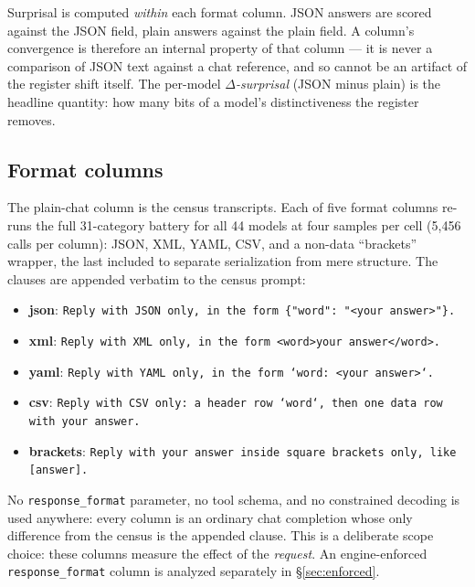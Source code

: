 \documentclass[11pt]{article}
\begin{document}
Surprisal is computed \emph{within} each format column. JSON answers are scored against the JSON field, plain answers
against the plain field. A column's convergence is therefore an internal property of that
column --- it is never a comparison of JSON text against a chat reference, and so cannot be an
artifact of the register shift itself. The per-model \emph{$\Delta$-surprisal} (JSON minus
plain) is the headline quantity: how many bits of a model's distinctiveness the register
removes.

\subsection{Format columns}
The plain-chat column is the census transcripts. Each of five format columns re-runs the full
31-category battery for all 44 models at four samples per cell (5{,}456 calls per column):
JSON, XML, YAML, CSV, and a non-data ``brackets'' wrapper, the last included to separate
serialization from mere structure. The clauses are appended verbatim to the census prompt:

\begin{itemize}
\item \textbf{json}: \texttt{Reply with JSON only, in the form \{"word": "<your answer>"\}.}
\item \textbf{xml}: \texttt{Reply with XML only, in the form <word>your answer</word>.}
\item \textbf{yaml}: \texttt{Reply with YAML only, in the form `word: <your answer>`.}
\item \textbf{csv}: \texttt{Reply with CSV only: a header row `word`, then one data row with your answer.}
\item \textbf{brackets}: \texttt{Reply with your answer inside square brackets only, like [answer].}
\end{itemize}

No \texttt{response\_format} parameter, no tool schema, and no constrained decoding is used
anywhere: every column is an ordinary chat completion whose only difference from the census is
the appended clause. This is a deliberate scope choice: these columns measure the effect of the
\emph{request}. An engine-enforced \texttt{response\_format} column is analyzed separately in
\S\ref{sec:enforced}.
\end{document}
